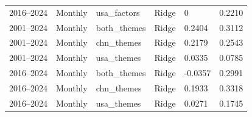 \begin{table}[htbp]
\begin{tabular}{@{}lllllr@{}}
2016--2024  & Monthly     & usa\_factors   & Ridge          & 0         & 0.2210 \\
2001--2024  & Monthly     & both\_themes   & Ridge          & 0.2404         & 0.3112 \\
2001--2024  & Monthly     & chn\_themes    & Ridge          & 0.2179         & 0.2543 \\
2001--2024  & Monthly     & usa\_themes    & Ridge          & 0.0335         & 0.0785 \\
2016--2024  & Monthly     & both\_themes   & Ridge          & -0.0357        & 0.2991 \\
2016--2024  & Monthly     & chn\_themes    & Ridge          & 0.1933         & 0.3318 \\
2016--2024  & Monthly     & usa\_themes    & Ridge          & 0.0271         & 0.1745 \\ \bottomrule
\end{tabular}
\end{table}


